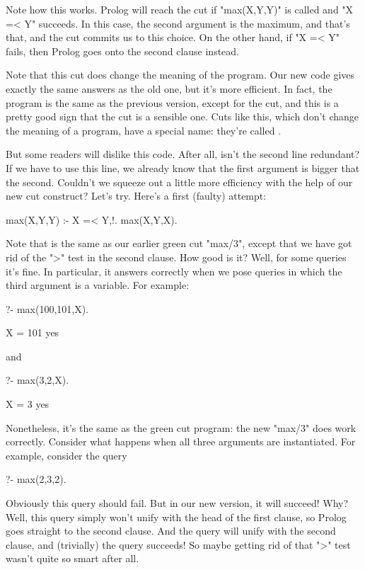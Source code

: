 Note how this works. Prolog will reach the cut if "max(X,Y,Y)" is
called and "X =< Y" succeeds. In this case, the second argument
is the maximum, and that's that, and the cut commits us to this
choice. On the other hand, if "X =< Y" fails, then Prolog goes
onto the second clause instead.

Note that this cut does  change the meaning of the
program.  Our new code gives exactly the same answers as the old one,
but it's more efficient.  In fact, the program is 
the same as the previous version, except for the cut, and this is a
pretty good sign that the cut is a sensible one. Cuts like this, which
don't change the meaning of a program, have a special name: they're
called .

But some readers will dislike this code. After all, isn't the second line
redundant? If we have to use this line, we already know that the first argument
is bigger that the second. Couldn't we squeeze out a little more efficiency
with the help of our new cut construct? Let's try. Here's a first (faulty)
attempt:
\begin{LPNcodedisplay}
max(X,Y,Y) :- X =< Y,!.
max(X,Y,X).
\end{LPNcodedisplay}
Note that is the same as our earlier green cut "max/3", except that we have got
rid of the ">" test in the second clause.  How good is it?  Well, for some
queries it's fine. In particular, it answers correctly when we pose queries in
which the third argument is a variable. For example:
\begin{LPNcodedisplay}
?- max(100,101,X).

X = 101
yes
\end{LPNcodedisplay}

and
\begin{LPNcodedisplay}
?- max(3,2,X).

X = 3
yes
\end{LPNcodedisplay}

Nonetheless, it's  the same as the green cut program: the new
"max/3" does  work correctly. Consider what happens when all three arguments
are instantiated.  For example, consider the query
\begin{LPNcodedisplay}
?- max(2,3,2).
\end{LPNcodedisplay}
Obviously this query should fail.  But in our new version, it will
succeed!  Why? Well, this query simply won't unify with the head of
the first clause, so Prolog goes straight to the second clause. And
the query will unify with the second clause, and (trivially) the query
succeeds! So maybe getting rid of that ">" test wasn't quite so smart
after all.

